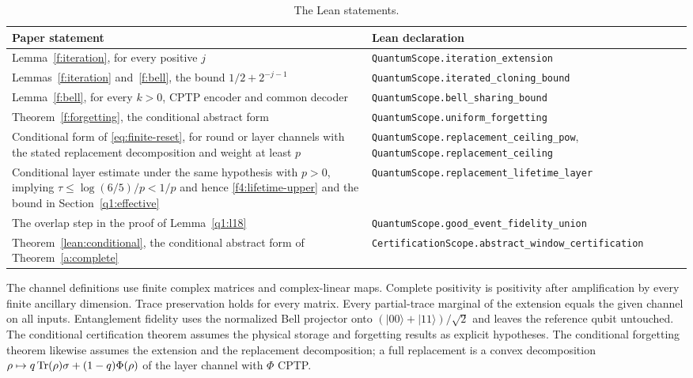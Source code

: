 \begin{table}[!htbp]
\caption{The Lean statements.}\label{tab:lean}
\small\centering
\begin{tabular}{@{}>{\raggedright\arraybackslash}p{}>{\raggedright\arraybackslash}p{}@{}}
\toprule
Paper statement & Lean declaration\\
\midrule
Lemma~\ref{f:iteration}, for every positive \(j\)
& \texttt{QuantumScope.iteration\_extension}\\\addlinespace[3pt]
Lemmas~\ref{f:iteration} and~\ref{f:bell}, the bound \(1/2+2^{-j-1}\)
& \texttt{QuantumScope.iterated\_cloning\_bound}\\\addlinespace[3pt]
Lemma~\ref{f:bell}, for every \(k>0\), CPTP encoder and common decoder
& \texttt{QuantumScope.bell\_sharing\_bound}\\\addlinespace[3pt]
Theorem~\ref{f:forgetting}, the conditional abstract form
& \texttt{QuantumScope.uniform\_forgetting}\\\addlinespace[3pt]
Conditional form of \eqref{eq:finite-reset}, for round or layer channels
with the stated replacement decomposition and weight at least \(p\)
& \texttt{QuantumScope.replacement\_ceiling\_pow},
  \texttt{QuantumScope.replacement\_ceiling}\\\addlinespace[3pt]
Conditional layer estimate under the same hypothesis with \(p>0\),
implying \(\tau\le\log(6/5)/p<1/p\) and hence
\eqref{f4:lifetime-upper} and the bound in Section~\ref{q1:effective}
& \texttt{QuantumScope.replacement\_lifetime\_layer}\\\addlinespace[3pt]
The overlap step in the proof of Lemma~\ref{q1:l18}
& \texttt{QuantumScope.good\_event\_fidelity\_union}\\\addlinespace[3pt]
Theorem~\ref{lean:conditional}, the conditional abstract form
of Theorem~\ref{a:complete}
& \texttt{CertificationScope.abstract\_window\_certification}\\
\bottomrule
\end{tabular}
\end{table}

The channel definitions use finite complex matrices and complex-linear
maps. Complete positivity is positivity after amplification by every
finite ancillary dimension. Trace preservation holds for every matrix.
Every partial-trace marginal of the extension equals the given channel
on all inputs. Entanglement fidelity uses the normalized Bell projector
onto \((|00\rangle+|11\rangle)/\sqrt2\) and leaves the reference qubit
untouched. The conditional certification theorem assumes the physical storage and forgetting results as explicit hypotheses. The conditional forgetting theorem likewise assumes the extension and the replacement decomposition; a full replacement is a convex decomposition \(\rho\mapsto q\operatorname{Tr}(\rho)\sigma+(1-q)\Phi(\rho)\) of the layer channel with \(\Phi\) CPTP.


